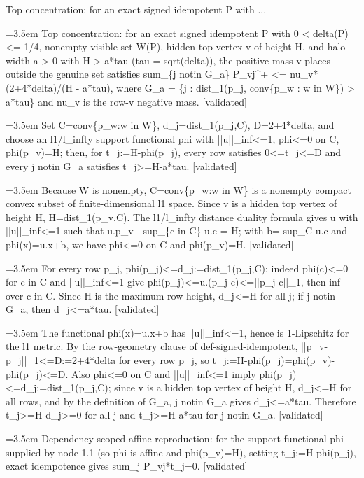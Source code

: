 \documentclass{article}
\newcommand{\step}[1]{\par\noindent\hangindent=3.5em\hangafter=1%
  \makebox[3.5em][l]{\textbf{#1.}}}
\newcommand{\steptag}[1]{\hfill{\small\textsf{[#1]}}}
\begin{document}
\begin{proofbox}{Top concentration: for an exact signed idempotent P with ...}
\step{1} Top concentration: for an exact signed idempotent P with 0 < delta(P) <= 1/4, nonempty visible set W(P), hidden top vertex v of height H, and halo width a > 0 with H > a*tau (tau = sqrt(delta)), the positive mass v places outside the genuine set satisfies sum\_\{j notin G\_a\} P\_vj\textasciicircum{}+ <= nu\_v*(2+4*delta)/(H - a*tau), where G\_a = \{j : dist\_1(p\_j, conv\{p\_w : w in W\}) > a*tau\} and nu\_v is the row-v negative mass. \steptag{validated} \\[6pt]
\step{1.1} Set C=conv\{p\_w:w in W\}, d\_j=dist\_1(p\_j,C), D=2+4*delta, and choose an l1/l\_infty support functional phi with ||u||\_inf<=1, phi<=0 on C, phi(p\_v)=H; then, for t\_j:=H-phi(p\_j), every row satisfies 0<=t\_j<=D and every j notin G\_a satisfies t\_j>=H-a*tau. \steptag{validated} \\[6pt]
\step{1.1.1} Because W is nonempty, C=conv\{p\_w:w in W\} is a nonempty compact convex subset of finite-dimensional l1 space. Since v is a hidden top vertex of height H, H=dist\_1(p\_v,C). The l1/l\_infty distance duality formula gives u with ||u||\_inf<=1 such that u.p\_v - sup\_\{c in C\} u.c = H; with b=-sup\_C u.c and phi(x)=u.x+b, we have phi<=0 on C and phi(p\_v)=H. \steptag{validated} \\[4pt]
\step{1.1.2} For every row p\_j, phi(p\_j)<=d\_j:=dist\_1(p\_j,C): indeed phi(c)<=0 for c in C and ||u||\_inf<=1 give phi(p\_j)<=u.(p\_j-c)<=||p\_j-c||\_1, then inf over c in C. Since H is the maximum row height, d\_j<=H for all j; if j notin G\_a, then d\_j<=a*tau. \steptag{validated} \\[4pt]
\step{1.1.3} The functional phi(x)=u.x+b has ||u||\_inf<=1, hence is 1-Lipschitz for the l1 metric. By the row-geometry clause of def-signed-idempotent, ||p\_v-p\_j||\_1<=D:=2+4*delta for every row p\_j, so t\_j:=H-phi(p\_j)=phi(p\_v)-phi(p\_j)<=D. Also phi<=0 on C and ||u||\_inf<=1 imply phi(p\_j)<=d\_j:=dist\_1(p\_j,C); since v is a hidden top vertex of height H, d\_j<=H for all rows, and by the definition of G\_a, j notin G\_a gives d\_j<=a*tau. Therefore t\_j>=H-d\_j>=0 for all j and t\_j>=H-a*tau for j notin G\_a. \steptag{validated} \\[4pt]
\step{1.2} Dependency-scoped affine reproduction: for the support functional phi supplied by node 1.1 (so phi is affine and phi(p\_v)=H), setting t\_j:=H-phi(p\_j), exact idempotence gives sum\_j P\_vj*t\_j=0. \steptag{validated} \\[6pt]

\end{proofbox}
\end{document}
